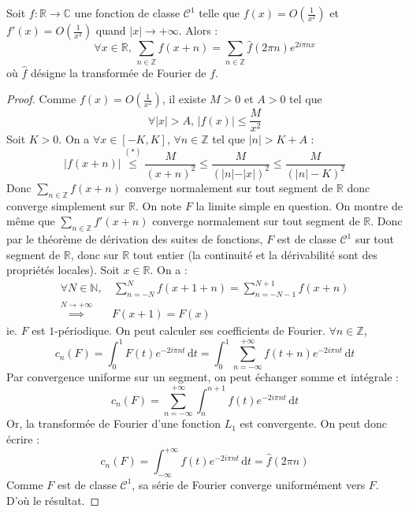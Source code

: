 






  \begin{theorem}
    \label{formule-sommatoire-de-poisson-1}
    Soit $f : \mathbb{R} \rightarrow \mathbb{C}$ une fonction de classe $\mathcal{C}^1$ telle que $f(x) = O \left( \frac{1}{x^2} \right)$ et $f'(x) = O \left( \frac{1}{x^2} \right)$ quand $|x| \longrightarrow +\infty$. Alors :
    \[ \forall x \in \mathbb{R}, \, \sum_{n \in \mathbb{Z}} f(x+n) = \sum_{n \in \mathbb{Z}} \widehat{f}(2 \pi n) e^{2 i \pi n x} \]
    où $\widehat{f}$ désigne la transformée de Fourier de $f$.
  \end{theorem}

  \begin{proof}
    Comme $f(x) = O \left( \frac{1}{x^2} \right)$, il existe $M > 0$ et $A > 0$ tel que
    \[ \forall |x| > A, \, |f(x)| \leq \frac{M}{x^2} \tag{$*$} \]
    Soit $K > 0$. On a $\forall x \in [-K, K]$, $\forall n \in \mathbb{Z}$ tel que $|n| > K + A$ :
    \[ |f(x+n)| \overset{(*)}{\leq} \frac{M}{(x+n)^2} \leq \frac{M}{(\vert n \vert - \vert x \vert)^2} \leq \frac{M}{(|n| - K)^2} \]
    Donc $\sum_{n \in \mathbb{Z}} f(x+n)$ converge normalement sur tout segment de $\mathbb{R}$ donc converge simplement sur $\mathbb{R}$. On note $F$ la limite simple en question.
    \newpar
    On montre de même que $\sum_{n \in \mathbb{Z}} f'(x+n)$ converge normalement sur tout segment de $\mathbb{R}$. Donc par le théorème de dérivation des suites de fonctions, $F$ est de classe $\mathcal{C}^1$ sur tout segment de $\mathbb{R}$, donc sur $\mathbb{R}$ tout entier (la continuité et la dérivabilité sont des propriétés locales).
    \newpar
    Soit $x \in \mathbb{R}$. On a :
    \begin{align*}
      \forall N \in \mathbb{N}, &\, \sum_{n=-N}^N f(x+1+n) = \sum_{n=-N-1}^{N+1} f(x+n) \\
      \overset{N \longrightarrow +\infty}{\implies} & F(x+1) = F(x)
    \end{align*}
    ie. $F$ est $1$-périodique. On peut calculer ses coefficients de Fourier. $\forall n \in \mathbb{Z}$,
    \[ c_n(F) = \int_0^1 F(t) e^{-2i\pi n t} \, \mathrm{d}t = \int_0^1 \sum_{n=-\infty}^{+\infty} f(t+n) e^{-2i\pi n t} \, \mathrm{d}t \]
    Par convergence uniforme sur un segment, on peut échanger somme et intégrale :
    \[ c_n(F) = \sum_{n=-\infty}^{+\infty} \int_n^{n+1} f(t) e^{-2i\pi n t} \, \mathrm{d}t \]
    Or, la transformée de Fourier d'une fonction $L_1$ est convergente. On peut donc écrire :
    \[ c_n(F) = \int_{-\infty}^{+\infty} f(t) e^{-2i\pi n t} \, \mathrm{d}t = \widehat{f}(2\pi n) \]
    Comme $F$ est de classe $\mathcal{C}^1$, sa série de Fourier converge uniformément vers $F$. D'où le résultat.
  \end{proof}

